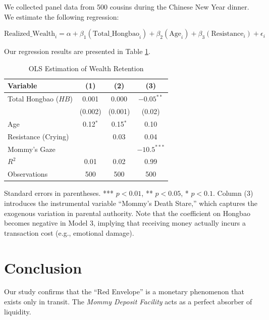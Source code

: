 \documentclass[AER]{AEA}
\begin{document}
We collected panel data from 500 cousins during the Chinese New Year dinner. We estimate the following regression:

\begin{equation}
    \text{Realized\_Wealth}_i = \alpha + \beta_1 (\text{Total\_Hongbao}_i) + \beta_2 (\text{Age}_i) + \beta_3 (\text{Resistance}_i) + \epsilon_i
\end{equation}

Our regression results are presented in Table \ref{tab:results}.

\begin{table}[ht] %
\caption{OLS Estimation of Wealth Retention}
\label{tab:results}
\begin{tabular}{lccc}
\toprule
Variable & (1) & (2) & (3) \\
\midrule
Total Hongbao ($HB$) & 0.001 & 0.000 & $-0.05^{**}$ \\
                     & (0.002) & (0.001) & (0.02) \\
Age                  & 0.12$^*$ & 0.15$^*$ & 0.10 \\
Resistance (Crying)  &         & 0.03  & 0.04 \\
Mommy's Gaze         &         &       & $-10.5^{***}$ \\
\midrule
$R^2$                & 0.01    & 0.02  & 0.99 \\
Observations         & 500     & 500   & 500 \\
\bottomrule
\end{tabular}
\begin{tablenotes}
Standard errors in parentheses. *** $p<0.01$, ** $p<0.05$, * $p<0.1$.
Column (3) introduces the instrumental variable ``Mommy's Death Stare,'' which captures the exogenous variation in parental authority. Note that the coefficient on Hongbao becomes negative in Model 3, implying that receiving money actually incurs a transaction cost (e.g., emotional damage).
\end{tablenotes}
\end{table}

\FloatBarrier

\section{Conclusion}

Our study confirms that the ``Red Envelope'' is a monetary phenomenon that exists only in transit. The \textit{Mommy Deposit Facility} acts as a perfect absorber of liquidity. 
\end{document}
